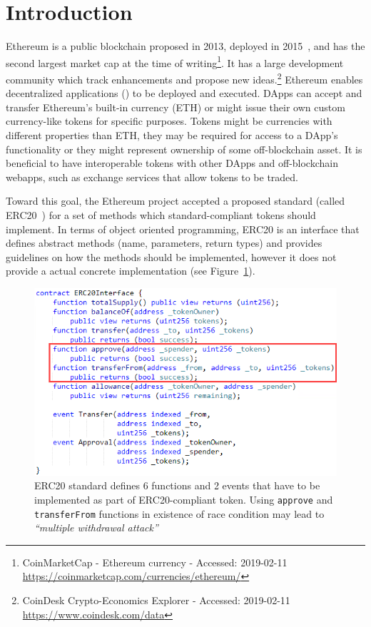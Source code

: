 
\section{Introduction}

Ethereum is a public blockchain proposed in 2013, deployed in 2015~\cite{Ref00}, and has the second largest market cap at the time of writing\footnote{CoinMarketCap - Ethereum currency - Accessed: 2019-02-11 \newline\url{https://coinmarketcap.com/currencies/ethereum/}}. It has a large development community which track enhancements and propose new ideas.\footnote{CoinDesk Crypto-Economics Explorer - Accessed: 2019-02-11 \newline\url{https://www.coindesk.com/data}} Ethereum enables decentralized applications (\dapps) to be deployed and executed. DApps can accept and transfer Ethereum's built-in currency (ETH) or might issue their own custom currency-like tokens for specific purposes. Tokens might be currencies with different properties than ETH, they may be required for access to a DApp's functionality or they might represent ownership of some off-blockchain asset. It is beneficial to have interoperable tokens with other DApps and off-blockchain webapps, such as exchange services that allow tokens to be traded.

Toward this goal, the Ethereum project accepted a proposed standard (called ERC20~\cite{Ref08}) for a set of methods which standard-compliant tokens should implement. In terms of object oriented programming, ERC20 is an interface that defines abstract methods (name, parameters, return types) and provides guidelines on how the methods should be implemented, however it does not provide a actual concrete implementation (see Figure~\ref{fig:erc20api}). 

\begin{figure}[t!]
	\centering
	\includegraphics[width=1.0\linewidth]{figures/multiple_withdrawal_01.png}
	\caption{ERC20 standard defines 6 functions and 2 events that have to be implemented as part of ERC20-compliant token. Using \texttt{approve} and \texttt{transferFrom} functions in existence of race condition may lead to \textit{``multiple withdrawal attack''}\label{fig:erc20api}}
\end{figure}

